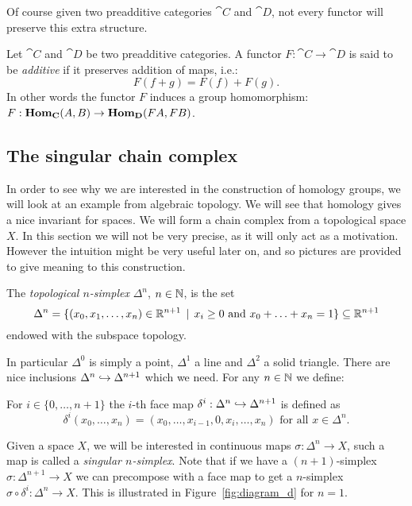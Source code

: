 Of course given two preadditive categories $\cat{C}$ and $\cat{D}$, not every functor will preserve this extra structure.
\begin{definition}
	Let $\cat{C}$ and $\cat{D}$ be two preadditive categories. A functor $F: \cat{C} \to \cat{D}$ is said to be \emph{additive} if it preserves addition of maps, i.e.:
	$$ F(f + g) = F(f) + F(g). $$
	In other words the functor $F$ induces a group homomorphism: $F : \mathbf{Hom}_{\mathbf{C}}(A, B) \to \mathbf{Hom}_{\mathbf{D}}(FA, FB)$.
\end{definition}


\subsection{The singular chain complex}
\label{sec:singular}
In order to see why we are interested in the construction of homology groups, we will look at an example from algebraic topology. We will see that homology gives a nice invariant for spaces. We will form a chain complex from a topological space $X$. In this section we will not be very precise, as it will only act as a motivation. However the intuition might be very useful later on, and so pictures are provided to give meaning to this construction.

\begin{definition}
	The \emph{topological $n$-simplex} $\Delta^n$, $n \in \mathbb{N}$, is the set
	$$ \Delta^n = \{(x_0, x_1, \ldots, x_n) \in \mathbb{R}^{n+1} \,\mid\, x_i \geq 0 \text{ and } x_0 + \ldots + x_n = 1 \} \subseteq \mathbb{R}^{n+1} $$
	endowed with the subspace topology.
\end{definition}

In particular $\Delta^0$ is simply a point, $\Delta^1$ a line and $\Delta^2$ a solid triangle. There are nice inclusions $\Delta^n \hookrightarrow \Delta^{n+1}$ which we need. For any $n \in \mathbb{N}$ we define:
\begin{definition}
	For $i \in \{0, \ldots, n+1\}$ the $i$-th face map $\delta^i : \Delta^n \hookrightarrow \Delta^{n+1}$ is defined as
	$$ \delta^i (x_0, \ldots, x_n) = (x_0, \ldots, x_{i-1}, 0, x_{i}, \ldots, x_n) \text{ for all } x \in \Delta^n.$$
\end{definition}

Given a space $X$, we will be interested in continuous maps $\sigma : \Delta^n \to X$, such a map is called a \emph{singular $n$-simplex}. Note that if we have a $(n+1)$-simplex $\sigma : \Delta^{n+1} \to X$ we can precompose with a face map to get a $n$-simplex $\sigma \circ \delta^i : \Delta^n \to X$. This is illustrated in Figure~\ref{fig:diagram_d} for $n=1$.

